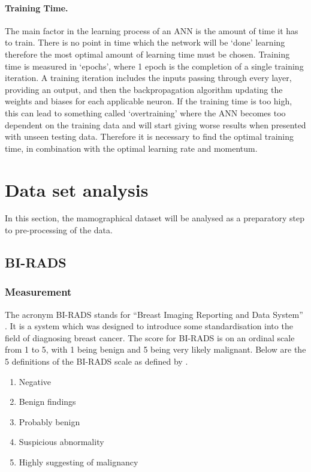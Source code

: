 \documentclass[12pt]{article}
\begin{document}
        \paragraph{Training Time.}
          The main factor in the learning process of an ANN is the amount of time it has to train. There is no point in time which the network will be ‘done’ learning therefore the most optimal amount of learning time must be chosen. Training time is measured in ‘epochs’, where 1 epoch is the completion of a single training iteration. A training iteration includes the inputs passing through every layer, providing an output, and then the backpropagation algorithm updating the weights and biases for each applicable neuron. If the training time is too high, this can lead to something called ‘overtraining’ where the ANN becomes too dependent on the training data and will start giving worse results when presented with unseen testing data. Therefore it is necessary to find the optimal training time, in combination with the optimal learning rate and momentum.

\section{Data set analysis} \label{data-set-analysis}
  In this section, the mamographical dataset will be analysed as a preparatory step to pre-processing of the data.

    \subsection{BI-RADS} \label{birad}
      \subsubsection{Measurement}
        The acronym BI-RADS stands for “Breast Imaging Reporting and Data System” \citep{american1998breast}. It is a system which was designed to introduce some standardisation into the field of diagnosing breast cancer. The score for BI-RADS is on an ordinal scale from 1 to 5, with 1 being benign and 5 being very likely malignant.
        Below are the 5 definitions of the BI-RADS scale as defined by \cite{american1998breast}.

        \singlespacing
        \begin{enumerate}[label=\arabic*)]
          \item Negative
          \item Benign findings
          \item Probably benign
          \item Suspicious abnormality
          \item Highly suggesting of malignancy
        \end{enumerate}
        \doublespacing
\end{document}
